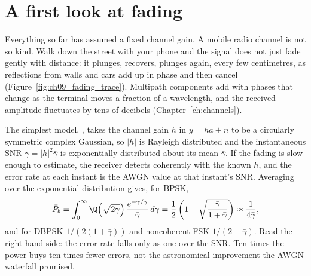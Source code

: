 \section{A first look at fading}
\label{sec:ch09:fading}

Everything so far has assumed a fixed channel gain. A mobile radio channel is not so kind. Walk
down the street with your phone and the signal does not just fade gently with distance: it
plunges, recovers, plunges again, every few centimetres, as reflections from walls and cars add
up in phase and then cancel (Figure~\ref{fig:ch09_fading_trace}). Multipath components add with
phases that change as the terminal moves a fraction of a wavelength, and the received amplitude
fluctuates by tens of decibels (Chapter~\ref{ch:channels}).


The simplest model, , takes the channel gain $h$ in $y=ha+n$ to be a
circularly symmetric complex Gaussian, so $|h|$ is Rayleigh distributed and the instantaneous SNR
$\gamma=|h|^2\bar\gamma$ is exponentially distributed about its mean $\bar\gamma$. If the fading is
slow enough to estimate, the receiver detects coherently with the known $h$, and the error rate at
each instant is the AWGN value at that instant's SNR. Averaging over the exponential distribution
gives, for BPSK,
\begin{equation}
\bar P_b=\int_0^\infty\Q\!\left(\sqrt{2\gamma}\right)\frac{e^{-\gamma/\bar\gamma}}{\bar\gamma}\,d\gamma
=\frac12\left(1-\sqrt{\frac{\bar\gamma}{1+\bar\gamma}}\right)\approx\frac{1}{4\bar\gamma},
\label{eq:ch09:rayleigh}
\end{equation}
and for DBPSK $1/(2(1+\bar\gamma))$ and noncoherent FSK $1/(2+\bar\gamma)$. Read the right-hand
side: the error rate falls only as one over the SNR. Ten times the power buys ten times fewer
errors, not the astronomical improvement the AWGN waterfall promised.



